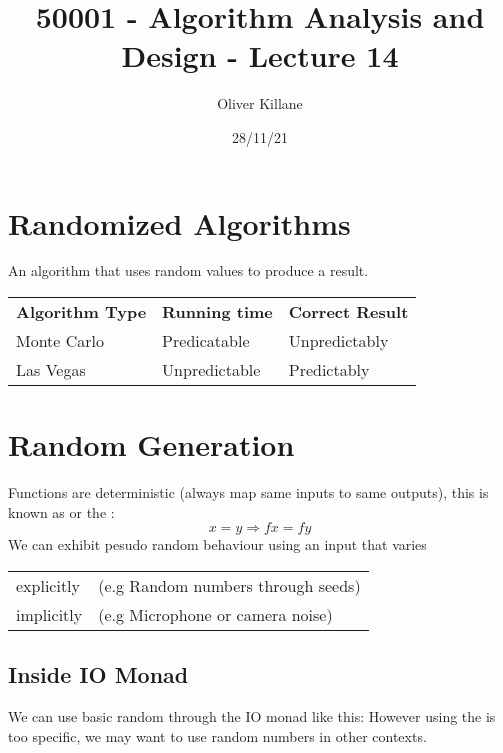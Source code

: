 \documentclass{report}
\title{50001 - Algorithm Analysis and Design - Lecture 14}
\author{Oliver Killane}
\date{28/11/21}
\begin{document}
    \maketitle

    \section*{Randomized Algorithms}
        An algorithm that uses random values to produce a result.
        \begin{center}
            \begin{tabular}{l l l}
                \textbf{Algorithm Type} & \textbf{Running time} & \textbf{Correct Result} \\
                Monte Carlo & Predicatable & Unpredictably \\
                Las Vegas & Unpredictable & Predictably \\
            \end{tabular}
        \end{center}
    
    \section*{Random Generation}
        
        Functions are deterministic (always map same inputs to same outputs), this is known as  or the :
        \[x = y \Rightarrow f x = f y\]
        We can exhibit pesudo random behaviour using an input that varies \begin{tabular}{l l}
            explicitly & (e.g Random numbers through seeds) \\
            implicitly & (e.g Microphone or camera noise) \\
        \end{tabular}

        \subsection*{Inside IO Monad}
            We can use basic random through the IO monad like this:
            However using the  is too specific, we may want to use random numbers in other contexts.
        
\end{document}

